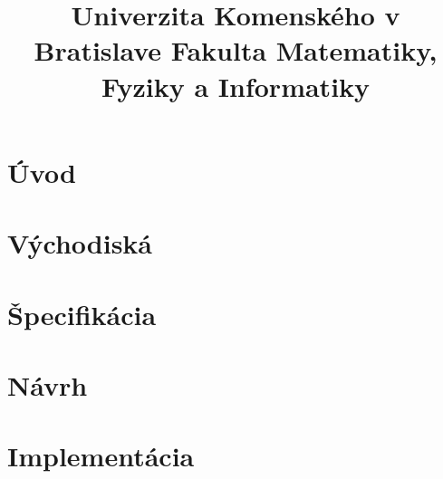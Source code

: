\documentclass[12pt,a4paper]{bachelor}
\title{Univerzita Komenského v Bratislave Fakulta Matematiky, Fyziky a Informatiky}
\author{\autor}
\begin{document}


\tableofcontents
\newpage

\chapter{Úvod}


\chapter{Východiská}


\chapter{Špecifikácia}


\chapter{Návrh}


\chapter{Implementácia}


\printbibliography

\label{totalpages}
\end{document}
